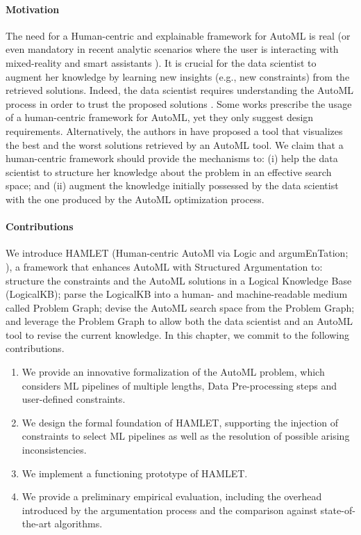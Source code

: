 \paragraph{Motivation}
The need for a Human-centric and explainable framework for AutoML is real \cite{gil2019towards, lee2020human, wang2019human} (or even mandatory in recent analytic scenarios where the user is interacting with mixed-reality and smart assistants \cite{DBLP:conf/dolap/FranciaGR19,DBLP:journals/is/FranciaGG22}).
It is crucial for the data scientist to augment her knowledge by learning new insights (e.g., new constraints) from the retrieved solutions.
Indeed, the data scientist requires understanding the AutoML process in order to trust the proposed solutions \cite{drozdal2020trust}.
Some works \cite{gil2019towards, lee2020human, wang2019human} prescribe the usage of a human-centric framework for AutoML, yet they only suggest design requirements.
Alternatively, the authors in \cite{ono2020pipelineprofiler} have proposed a tool that visualizes the best and the worst solutions retrieved by an AutoML tool.
We claim that a human-centric framework should provide the mechanisms to: (i) help the data scientist to structure her knowledge about the problem in an effective search space; and (ii) augment the knowledge initially possessed by the data scientist with the one produced by the AutoML optimization process.

\paragraph{Contributions}
We introduce HAMLET (Human-centric AutoMl via Logic and argumEnTation; ), a framework that enhances AutoML with Structured Argumentation to:
structure the constraints and the AutoML solutions in a Logical Knowledge Base (LogicalKB);
parse the LogicalKB into a human- and machine-readable medium called Problem Graph;
devise the AutoML search space from the Problem Graph;
and leverage the Problem Graph to allow both the data scientist and an AutoML tool to revise the current knowledge.
In this chapter, we commit to the following contributions.
\begin{enumerate}
    \item We provide an innovative formalization of the AutoML problem, which considers ML pipelines of multiple lengths, Data Pre-processing steps and user-defined constraints.
    \item We design the formal foundation of HAMLET, supporting the injection of constraints to select ML pipelines as well as the resolution of possible arising inconsistencies.
    \item We implement a functioning prototype of HAMLET.
    \item We provide a preliminary empirical evaluation, including the overhead introduced by the argumentation process and the comparison against state-of-the-art algorithms.
\end{enumerate}

